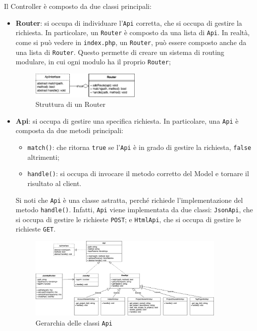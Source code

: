 Il Controller è composto da due classi principali:
\begin{itemize}
	\item \textbf{Router}: si occupa di individuare l'\texttt{Api} corretta, che
		si occupa di gestire la richiesta. In particolare, un \texttt{Router} è 
		composto da una lista di \texttt{Api}. In realtà, come si può vedere 
		in \texttt{index.php}, un \texttt{Router}, può essere composto anche da
		una lista di \texttt{Router}. Questo permette di creare un sistema di
		routing modulare, in cui ogni modulo ha il proprio \texttt{Router};
		\begin{figure}[H]
			\centering
			\includegraphics[width=0.5\textwidth]{figures/RouterClassDiagram.png}
			\caption{Struttura di un Router}
		\end{figure}

	\item \textbf{Api}: si occupa di gestire una specifica richiesta. In 
		particolare, una \texttt{Api} è composta da due metodi principali:
		\begin{itemize}
			\item \texttt{match()}: che ritorna \texttt{true} se l'\texttt{Api}
				è in grado di gestire la richiesta, \texttt{false} altrimenti;

			\item \texttt{handle()}: si occupa di invocare il metodo corretto 
				del Model e tornare il risultato al client.
		\end{itemize}

		Si noti che \texttt{Api} è una classe astratta, perché richiede
		l'implementazione del metodo \texttt{handle()}. Infatti, \texttt{Api}
		viene implementata da due classi: \texttt{JsonApi}, che si occupa di
		gestire le richieste \texttt{POST}; e \texttt{HtmlApi}, che si occupa di
		gestire le richieste \texttt{GET}.
		\begin{figure}[H]
			\centering
			\includegraphics[width=0.9\textwidth]{figures/ApiClassDiagram.png}
			\caption{Gerarchia delle classi \texttt{Api}}
		\end{figure}
\end{itemize}

